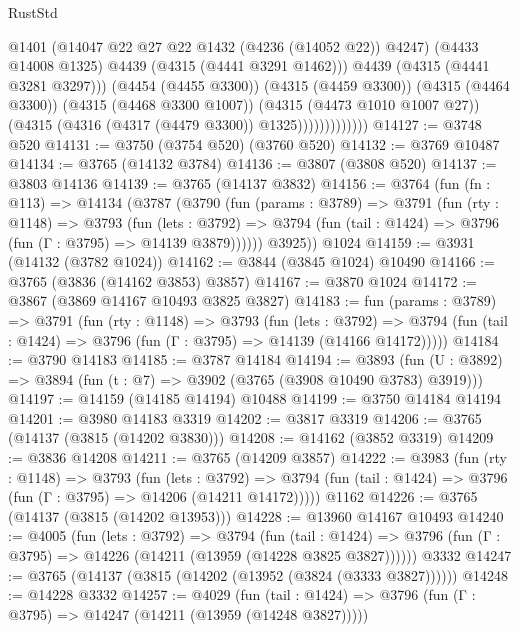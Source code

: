 \begin{lexlean}{RustStd}
\begin{coremodule}
                              @1401
                              (@14047 @22 @27 @22 @1432 (@4236 (@14052 @22)) @4247)
                              (@4433 @14008 @1325)
                              @4439
                              (@4315 (@4441 @3291 @1462)))
                            @4439
                            (@4315 (@4441 @3281 @3297)))
                          (@4454 (@4455 @3300))
                          (@4315 (@4459 @3300))
                          (@4315 (@4464 @3300))
                          (@4315 (@4468 @3300 @1007))
                          (@4315 (@4473 @1010 @1007 @27))
                          (@4315 (@4316 (@4317 (@4479 @3300)) @1325)))))))))))))
@14127 := @3748 @520
@14131 := @3750 (@3754 @520) (@3760 @520)
@14132 := @3769 @10487
@14134 := @3765 (@14132 @3784)
@14136 := @3807 (@3808 @520)
@14137 := @3803 @14136
@14139 := @3765 (@14137 @3832)
@14156 := @3764
    (fun (fn : @113) =>
    @14134
      (@3787
        (@3790
          (fun (params : @3789) =>
          @3791
            (fun (rty : @1148) =>
            @3793
              (fun (lets : @3792) =>
              @3794 (fun (tail : @1424) => @3796 (fun (Γ : @3795) => @14139 @3879))))))
        @3925))
    @1024
@14159 := @3931 (@14132 (@3782 @1024))
@14162 := @3844 (@3845 @1024) @10490
@14166 := @3765 (@3836 (@14162 @3853) @3857)
@14167 := @3870 @1024
@14172 := @3867 (@3869 @14167 @10493 @3825 @3827)
@14183 := fun (params : @3789) =>
  @3791
    (fun (rty : @1148) =>
    @3793
      (fun (lets : @3792) =>
      @3794 (fun (tail : @1424) => @3796 (fun (Γ : @3795) => @14139 (@14166 @14172)))))
@14184 := @3790 @14183
@14185 := @3787 @14184
@14194 := @3893
    (fun (U : @3892) => @3894 (fun (t : @7) => @3902 (@3765 (@3908 @10490 @3783) @3919)))
@14197 := @14159 (@14185 @14194) @10488
@14199 := @3750 @14184 @14194
@14201 := @3980 @14183 @3319
@14202 := @3817 @3319
@14206 := @3765 (@14137 (@3815 (@14202 @3830)))
@14208 := @14162 (@3852 @3319)
@14209 := @3836 @14208
@14211 := @3765 (@14209 @3857)
@14222 := @3983
    (fun (rty : @1148) =>
    @3793
      (fun (lets : @3792) =>
      @3794 (fun (tail : @1424) => @3796 (fun (Γ : @3795) => @14206 (@14211 @14172)))))
    @1162
@14226 := @3765 (@14137 (@3815 (@14202 @13953)))
@14228 := @13960 @14167 @10493
@14240 := @4005
    (fun (lets : @3792) =>
    @3794
      (fun (tail : @1424) =>
      @3796 (fun (Γ : @3795) => @14226 (@14211 (@13959 (@14228 @3825 @3827))))))
    @3332
@14247 := @3765 (@14137 (@3815 (@14202 (@13952 (@3824 (@3333 @3827))))))
@14248 := @14228 @3332
@14257 := @4029
    (fun (tail : @1424) => @3796 (fun (Γ : @3795) => @14247 (@14211 (@13959 (@14248 @3827)))))

\end{coremodule}
\end{lexlean}
